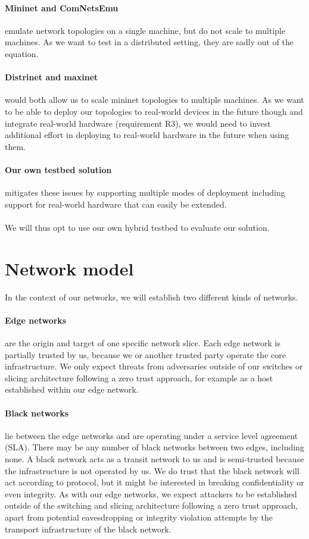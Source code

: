 \paragraph{Mininet and ComNetsEmu} emulate network topologies on a single machine, but do not scale to multiple machines. As we want to test in a distributed setting, they are sadly out of the equation.

\paragraph{Distrinet and maxinet} would both allow us to scale mininet topologies to multiple machines. As we want to be able to deploy our topologies to real-world devices in the future though and integrate real-world hardware (requirement R3), we would need to invest additional effort in deploying to real-world hardware in the future when using them.

\paragraph{Our own testbed solution} mitigates these issues by supporting multiple modes of deployment including support for real-world hardware that can easily be extended.

\paragraph{} We will thus opt to use our own hybrid testbed to evaluate our solution.

\section{Network model}
In the context of our networks, we will establish two different kinds of networks.
\paragraph{Edge networks}
are the origin and target of one specific network slice. Each edge network is partially trusted by us, because we or another trusted party operate the core infrastructure. We only expect threats from adversaries outside of our switches or slicing architecture following a zero trust approach, for example as a host established within our edge network.
\paragraph{Black networks}
lie between the edge networks and are operating under a service level agreement (SLA). There may be any number of black networks between two edges, including none. A black network acts as a transit network to us and is semi-trusted because the infrastructure is not operated by us. We do trust that the black network will act according to protocol, but it might be interested in breaking confidentiality or even integrity. As with our edge networks, we expect attackers to be established outside of the switching and slicing architecture following a zero trust approach, apart from potential eavesdropping or integrity violation attempts by the transport infrastructure of the black network.

